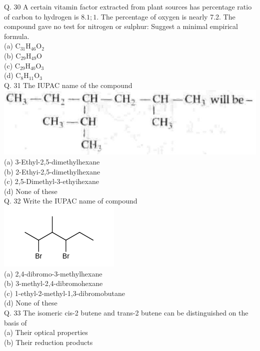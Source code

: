 \documentclass[10pt]{article}
\begin{document}
Q. 30 A certain vitamin factor extracted from plant sources has percentage ratio of carbon to hydrogen is $8.1 ; 1$. The percentage of oxygen is nearly 7.2. The compound gave no test for nitrogen or sulphur: Suggest a minimal empirical formula.\\
(a) $\mathrm{C}_{31} \mathrm{H}_{46} \mathrm{O}_{2}$\\
(b) $\mathrm{C}_{29} \mathrm{H}_{49} \mathrm{O}$\\
(c) $\mathrm{C}_{29} \mathrm{H}_{40} \mathrm{O}_{3}$\\
(d) $\mathrm{C}_{8} \mathrm{H}_{11} \mathrm{O}_{3}$\\
Q. 31 The IUPAC name of the compound\\
\includegraphics[max width=\textwidth, center]{2025_01_28_8470952b98110cec3aabg-134(1)}\\
(a) 3-Ethyl-2,5-dimethylhexane\\
(b) 2-Ethyi-2,5-dimethylhexane\\
(c) 2,5-Dimethyl-3-ethyihexane\\
(d) None of these\\
Q. 32 Write the IUPAC name of compound\\
\includegraphics{smile-c2e2da2ef04a2025df54160d9f0d9eea7f5d9cee}\\
(a) 2,4-dibromo-3-methylhexane\\
(b) 3-methyl-2,4-dibromohexane\\
(c) 1-ethyl-2-methyl-1,3-dibromobutane\\
(d) None of these\\
Q. 33 The isomeric cis-2 butene and trans-2 butene can be distinguished on the basis of\\
(a) Their optical properties\\
(b) Their reduction products\\
\end{document}

